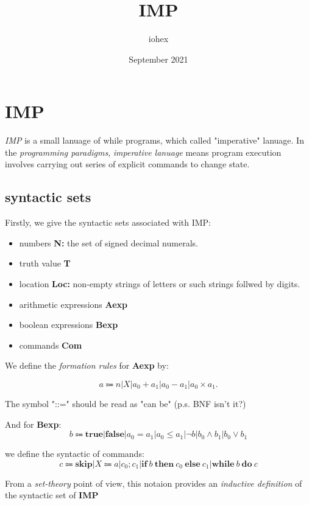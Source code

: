 \documentclass[a4paper, 12pt]{article}
\title{IMP}
\author{iohex}
\date{September 2021}
\begin{document}
    \maketitle
\section{IMP}
    \emph{IMP} is a small lanuage of while programs, which called "imperative" lanuage.
    In the \emph{programming paradigms}, \emph{imperative lanuage} means program execution involves carrying out series of explicit commands to change state.

    \subsection*{syntactic sets}
    Firstly, we give the syntactic sets associated with IMP:

        \begin{itemize}
            \item numbers \textbf{N:} the set of signed decimal numerals.
            \item truth value \textbf{T}
            \item location \textbf{Loc:} non-empty strings of letters or such strings follwed by digits.
            \item arithmetic expressions \textbf{Aexp}
            \item boolean expressions \textbf{Bexp}
            \item commands \textbf{Com}
        \end{itemize}
    
    We define the \emph{formation rules} for \textbf{Aexp} by:

    \[
        a \Coloneqq n | X | a_0+a_1|a_0-a_1|a_0 \times a_1.
    \]

    The symbol "::=" should be read as "can be" (p.s. BNF isn't it?)

    And for \textbf{Bexp}:
    \[
        b \Coloneqq \textbf{true} | \textbf{false} | a_0 = a_1 | a_0 \leq a_1 | \neg b | b_0 \wedge b_1 | b_0 \lor b_1
    \]

    we define the syntactic of commands:
    \[
        c \Coloneqq \textbf{skip} | X \Coloneq a | c_0;c_1 | \textbf{if}\ b\ \textbf{then}\ c_0\  \textbf{else}\ c_1 | \textbf{while}\ b\ \textbf{do}\ c
    \]

    From a \emph{set-theory} point of view, this notaion provides an \emph{inductive definition} of the syntactic set of \textbf{IMP}
\end{document}
